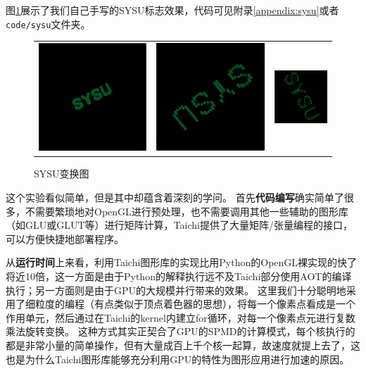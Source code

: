 \documentclass[thesis]{thesis}
\begin{document}
图\ref{fig:sysu}展示了我们自己手写的SYSU标志效果，代码可见附录\ref{appendix:sysu}或者\verb'code/sysu'文件夹。
\begin{figure}[!ht]
\centering
\begin{tabular}{ccc}
\includegraphics[width=0.33\linewidth]{fig/sysu1.jpg}&
\includegraphics[width=0.33\linewidth]{fig/sysu2.jpg}&
\includegraphics[width=0.33\linewidth]{fig/sysu3.png}
\end{tabular}
\caption{SYSU变换图}
\label{fig:sysu}
\end{figure}

这个实验看似简单，但是其中却蕴含着深刻的学问。
首先\textbf{代码编写}确实简单了很多，不需要繁琐地对OpenGL进行预处理，也不需要调用其他一些辅助的图形库（如GLU或GLUT等）进行矩阵计算，Taichi提供了大量矩阵/张量编程的接口，可以方便快捷地部署程序。

从\textbf{运行时间}上来看，利用Taichi图形库的实现比用Python的OpenGL裸实现的快了将近10倍，这一方面是由于Python的解释执行远不及Taichi部分使用AOT的编译执行；另一方面则是由于GPU的大规模并行带来的效果。
这里我们十分聪明地采用了细粒度的编程（有点类似于顶点着色器的思想），将每一个像素点看成是一个作用单元，然后通过在Taichi的kernel内建立for循环，对每一个像素点元进行复数乘法旋转变换。
这种方式其实正契合了GPU的SPMD的计算模式，每个核执行的都是非常小量的简单操作，但有大量成百上千个核一起算，故速度就提上去了，这也是为什么Taichi图形库能够充分利用GPU的特性为图形应用进行加速的原因。
\end{document}
